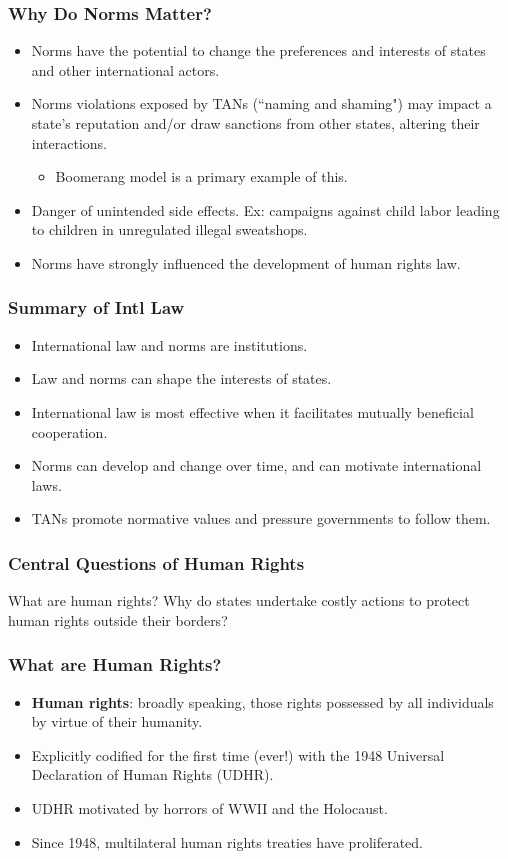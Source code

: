 \documentclass{beamer}
\begin{document}
\begin{frame} 
	\frametitle{\LARGE{Why Do Norms Matter?}}
	\begin{itemize}
		\item Norms have the potential to change the preferences and interests of states and other international actors. \pause
		\item Norms violations exposed by TANs (``naming and shaming") may impact a state's reputation and/or draw sanctions from other states, altering their interactions.
		\begin{itemize}
			\item Boomerang model is a primary example of this. \pause
		\end{itemize}
		\item Danger of unintended side effects. Ex: campaigns against child labor leading to children in unregulated illegal sweatshops.
		\item Norms have strongly influenced the development of human rights law.
	\end{itemize}
\end{frame}

\begin{frame} 
	\frametitle{\LARGE{Summary of Intl Law}}
	\begin{itemize}
		\item International law and norms are institutions.
		\item Law and norms can shape the interests of states.
		\item International law is most effective when it facilitates mutually beneficial cooperation.
		\item Norms can develop and change over time, and can motivate international laws.
		\item TANs promote normative values and pressure governments to follow them.	
	\end{itemize}
\end{frame}

\begin{frame} 
	\frametitle{\LARGE{Central Questions of Human Rights}}
	\centering
	\Large{What are human rights? Why do states undertake costly actions to protect human rights outside their borders?}
\end{frame}

\begin{frame} 
	\frametitle{\LARGE{What are Human Rights?}}
	\begin{itemize}
		\item \textbf{Human rights}: broadly speaking, those rights possessed by all individuals by virtue of their humanity. \pause
		
		\item Explicitly codified for the first time (ever!) with the 1948 Universal Declaration of Human Rights (UDHR). \pause
		\item UDHR motivated by horrors of WWII and the Holocaust.
		\item Since 1948, multilateral human rights treaties have proliferated.
		
	\end{itemize}
\end{frame}
\end{document}
